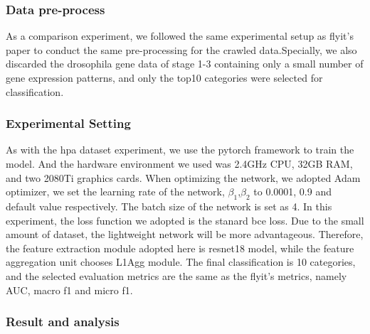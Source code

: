 \documentclass[10pt,twocolumn,letterpaper]{article}
\begin{document}
\subsubsection{Data pre-process}
As a comparison experiment, we followed the same experimental setup as flyit's\cite{ref27} paper to conduct the same pre-processing for the crawled data.Specially, we also discarded the drosophila gene data of stage 1-3 containing only a small number of gene expression patterns, and only the top10 categories were selected for classification.

\subsubsection{Experimental Setting}
As with the hpa dataset experiment, we use the pytorch framework to train the model. And the hardware environment we used was 2.4GHz CPU, 32GB RAM, and two 2080Ti graphics cards. When optimizing the network, we adopted Adam optimizer\cite{ref25}, we set the learning rate of the network, $\beta_1$,$\beta_2$ to 0.0001, 0.9 and default value respectively. The batch size of the network is set as 4. In this experiment, the loss function we adopted is the stanard bce loss. Due to the small amount of dataset, the lightweight network will be more advantageous. Therefore, the feature extraction module adopted here is resnet18 model, while the feature aggregation unit chooses L1Agg module. The final classification is 10 categories, and the selected evaluation metrics are the same as the flyit's\cite{ref27} metrics, namely AUC, macro f1 and micro f1.

\subsubsection{Result and analysis}
\end{document}
